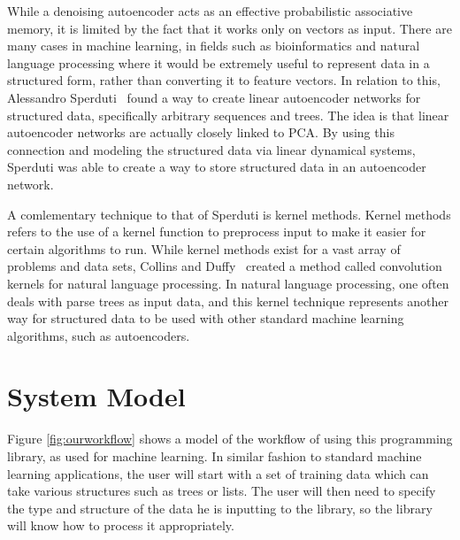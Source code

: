 \documentclass{sig-alternate}
\begin{document}
While a denoising autoencoder acts as an effective probabilistic associative memory, it is
limited by the fact that it works only on vectors as input. There are many cases in machine
learning, in fields such as bioinformatics and natural language processing where it would be 
extremely useful to represent data in a structured form, rather
than converting it to feature vectors. In relation to this, Alessandro Sperduti~\cite{sperduti}
found a way to create linear autoencoder networks for structured data, specifically
arbitrary sequences and trees. The idea is that linear autoencoder networks are actually
closely linked to PCA. By using this connection and modeling the structured data via
linear dynamical systems, Sperduti was able to create a way to store structured data
in an autoencoder network.

A comlementary technique to that of Sperduti is kernel methods. Kernel methods refers to the
use of a kernel function to preprocess input to make it easier for certain algorithms to run. 
While kernel methods exist for a vast array of problems and data sets, Collins and Duffy~\cite{kernels}
created a method called convolution kernels for natural language processing. In natural
language processing, one often deals with parse trees as input data, and this kernel technique
represents another way for structured data to be used with other standard machine learning
algorithms, such as autoencoders.

\section{System Model}
\label{sec:sysmodel}


Figure \ref{fig:ourworkflow} shows a model of the workflow of using this programming library, as 
used for machine learning. In similar fashion to standard machine learning applications, the user 
will start with a set of training data which can take various structures such as trees or lists. The 
user will then need to specify the type and structure of the data he is inputting to the library, so 
the library will know how to process it appropriately. 
\end{document}
